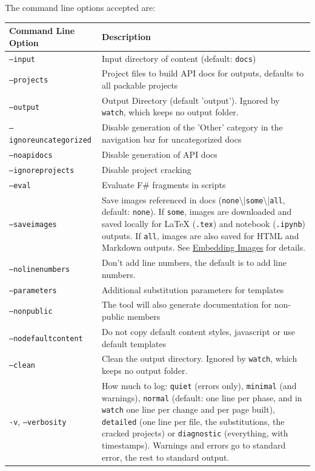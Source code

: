 \documentclass{article}
\begin{document}
The command line options accepted are:
\begin{tabular}{|l|l|}\hline
\textbf{Command Line Option} & \textbf{Description}\\ \hline\hline
\texttt{--input} & Input directory of content (default: \texttt{docs})\\ \hline
\texttt{--projects} & Project files to build API docs for outputs, defaults to all packable projects\\ \hline
\texttt{--output} & Output Directory (default 'output'). Ignored by \texttt{watch}, which keeps no output folder.\\ \hline
\texttt{--ignoreuncategorized} & Disable generation of the 'Other' category in the navigation bar for uncategorized docs\\ \hline
\texttt{--noapidocs} & Disable generation of API docs\\ \hline
\texttt{--ignoreprojects} & Disable project cracking\\ \hline
\texttt{--eval} & Evaluate F\# fragments in scripts\\ \hline
\texttt{--saveimages} & Save images referenced in docs (\texttt{none}{\textbackslash}|\texttt{some}{\textbackslash}|\texttt{all}, default: \texttt{none}). If \texttt{some}, images are downloaded and saved locally for LaTeX (\texttt{.tex}) and notebook (\texttt{.ipynb}) outputs. If \texttt{all}, images are also saved for HTML and Markdown outputs. See \href{\#embedding-images}{Embedding Images} for details.\\ \hline
\texttt{--nolinenumbers} & Don't add line numbers, the default is to add line numbers.\\ \hline
\texttt{--parameters} & Additional substitution parameters for templates\\ \hline
\texttt{--nonpublic} & The tool will also generate documentation for non-public members\\ \hline
\texttt{--nodefaultcontent} & Do not copy default content styles, javascript or use default templates\\ \hline
\texttt{--clean} & Clean the output directory. Ignored by \texttt{watch}, which keeps no output folder.\\ \hline
\texttt{-v}, \texttt{--verbosity} & How much to log: \texttt{quiet} (errors only), \texttt{minimal} (and warnings), \texttt{normal} (default: one line per phase, and in \texttt{watch} one line per change and per page built), \texttt{detailed} (one line per file, the substitutions, the cracked projects) or \texttt{diagnostic} (everything, with timestamps). Warnings and errors go to standard error, the rest to standard output.\\ \hline

\end{tabular}
\end{document}
